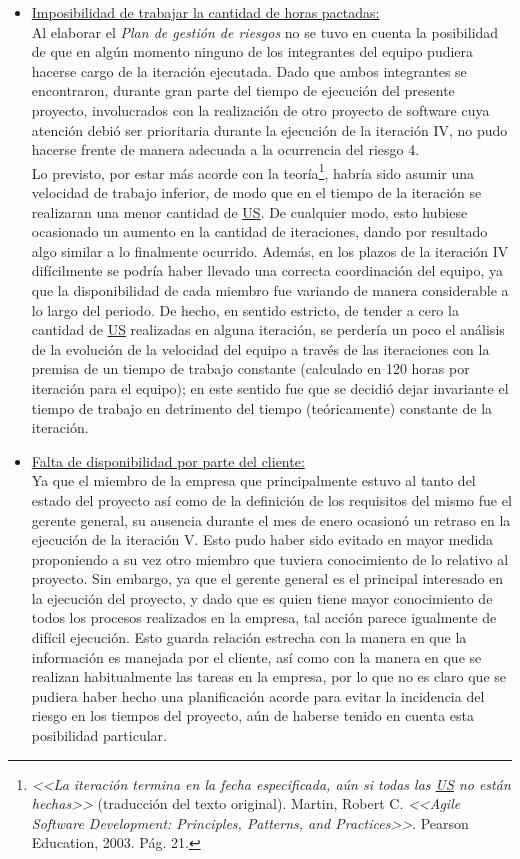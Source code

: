 \documentclass[a4paper, 12pt,twoside]{report}  %
\numberwithin{equation}{subsection} %
\begin{document}
\begin{itemize}
	\item \underline{Imposibilidad de trabajar la cantidad de horas pactadas:}\\
	Al elaborar el \textit{Plan de gestión de riesgos} no se tuvo en cuenta la posibilidad de que en algún momento ninguno de los integrantes del equipo pudiera hacerse cargo de la iteración ejecutada. Dado que ambos integrantes se encontraron, durante gran parte del tiempo de ejecución del presente proyecto, involucrados con la realización de otro proyecto de software cuya atención debió ser prioritaria durante la ejecución de la iteración IV, no pudo hacerse frente de manera adecuada a la ocurrencia del riesgo 4.\\
	Lo previsto, por estar más acorde con la teoría\footnote{\textit{<<La iteración termina en la fecha especificada, aún si todas las \hyperlink{US}{US} no están hechas>>} (traducción del texto original). Martin, Robert C. \textit{<<Agile Software Development: Principles, Patterns, and Practices>>}.  Pearson Education, 2003. Pág. 21.}, habría sido asumir una velocidad de trabajo inferior, de modo que en el tiempo de la iteración se realizaran una menor cantidad de \hyperlink{US}{US}. De cualquier modo, esto hubiese ocasionado un aumento en la cantidad de iteraciones, dando por resultado algo similar a lo finalmente ocurrido. Además, en los plazos de la iteración IV difícilmente se podría haber llevado una correcta coordinación del equipo, ya que la disponibilidad de cada miembro fue variando de manera considerable a lo largo del periodo. De hecho, en sentido estricto, de tender a cero la cantidad de \hyperlink{US}{US} realizadas en alguna iteración, se perdería un poco el análisis de la evolución de la velocidad del equipo a través de las iteraciones con la premisa de un tiempo de trabajo constante (calculado en 120 horas por iteración para el equipo); en este sentido fue que se decidió dejar invariante el tiempo de trabajo en detrimento del tiempo (teóricamente) constante de la iteración.
	\item \underline{Falta de disponibilidad por parte del cliente:}\\
	Ya que el miembro de la empresa que principalmente estuvo al tanto del estado del proyecto así como de la definición de los requisitos del mismo fue el gerente general, su ausencia durante el mes de enero ocasionó un retraso en la ejecución de la iteración V. Esto pudo haber sido evitado en mayor medida proponiendo a su vez otro miembro que tuviera conocimiento de lo relativo al proyecto. Sin embargo, ya que el gerente general es el principal interesado en la ejecución del proyecto, y dado que es quien tiene mayor conocimiento de todos los procesos realizados en la empresa, tal acción parece igualmente de difícil ejecución. Esto guarda relación estrecha con la manera en que la información es manejada por el cliente, así como con la manera en que se realizan habitualmente las tareas en la empresa, por lo que no es claro que se pudiera haber hecho una planificación acorde para evitar la incidencia del riesgo en los tiempos del proyecto, aún de haberse tenido en cuenta esta posibilidad particular.
\end{itemize}
\end{document}
